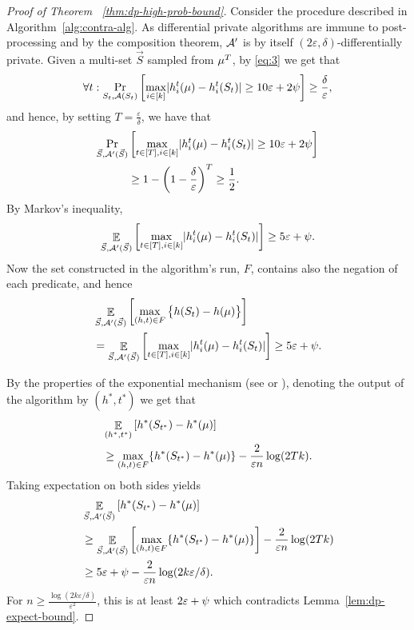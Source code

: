 \documentclass[12pt,a4paper,oneside,onecolumn]{book}
\begin{document}
\begin{proof}[Proof of Theorem ~\ref{thm:dp-high-prob-bound}]
  Consider the procedure
  described in Algorithm~\ref{alg:contra-alg}. As differential private algorithms are immune to post-processing
  and by the composition theorem,
  $\mathcal{A}'$ is by itself $(2\varepsilon, \delta)$-differentially private. 
  Given a multi-set $\vec{S}$ sampled from $\mu^T$,
  by \eqref{eq:3} we get that 
  \[\forall t: \Pr_{S_t,\mathcal{A}(S_t)}\left[
      \max_{i\in [k]}\lvert h^t_i(\mu)-h^t_i(S_t)\rvert\geq 10\varepsilon + 2\psi
    \right] \geq \frac{\delta}{\varepsilon},\]
  and hence, by setting $T=\frac{\varepsilon}{\delta}$, we have that 
  \begin{align*}
    \Pr_{\vec{S},\mathcal{A}'(\vec{S})} & 
    \left[
      \max_{t\in [T],i\in [k]}\lvert h^t_i(\mu)-h^t_i(S_t)\rvert 
      \geq 10\varepsilon + 2\psi
    \right] \\
    &\geq 
    1 - \left(1-\frac{\delta}{\varepsilon}\right)^T\geq \frac{1}{2}.
  \end{align*}
  By Markov's inequality,
  \[\mathop{\mathbb{E}}_{\vec{S},\mathcal{A}'(\vec{S})}\left[
      \max_{t\in [T],i\in [k]}\lvert h^t_i(\mu)-h^t_i(S_t)\rvert
    \right]
    \geq 5\varepsilon + \psi.\]
    Now
  the set constructed in the algorithm's run, $F$,  contains also the negation of each predicate,
  and hence
  \begin{align*}
    &\mathop{\mathbb{E}}_{\vec{S},\mathcal{A}'(\vec{S})}
    \left[
      \max_{(h,t)\in F}\big\{h(S_t) - h(\mu)\big\}
    \right] \\
    &=\mathop{\mathbb{E}}_{\vec{S},\mathcal{A}'(\vec{S})}\left[
      \max_{t\in [T],i\in [k]}\lvert h^t_i(\mu)-h^t_i(S_t)\rvert
    \right] 
    \geq 5\varepsilon + \psi      .
  \end{align*}

By the properties of the exponential mechanism
  (see \citet{mcsherry2007mechanism} or \citet{bassily2016algorithmic}), denoting the output of the algorithm by $(h^*,t^*)$ we get that
  \begin{align*}
    &\mathop{\mathbb{E}}_{(h^*,t^*)}
    \left[
    h^*(S_{t^*}) - h^*(\mu)
    \right] \\
    &\geq
    \max_{(h,t)\in F} \{ h^*(S_{t^*}) - h^*(\mu) \}
    - \frac{2}{\varepsilon n}\log(2Tk).
  \end{align*}
  Taking expectation on both sides yields
  \begin{align*}
    &\mathop{\mathbb{E}}_{\vec{S},\mathcal{A}'(\vec{S})} 
    \left[
    h^*(S_{t^*}) - h^*(\mu)
    \right] \\
    &\geq
    \mathop{\mathbb{E}}_{\vec{S},\mathcal{A}'(\vec{S})}\left[
    \max_{(h,t)\in F} \{ h^*(S_{t^*}) - h^*(\mu) \}
    \right]
    - \frac{2}{\varepsilon n}\log(2Tk) \\
    &\geq
    5\varepsilon + \psi - \frac{2}{\varepsilon n}\log(2k\varepsilon/\delta).
  \end{align*}
For $n \geq \frac{\log(2k\varepsilon/\delta)}{\varepsilon^2}$,
  this is at least $2\varepsilon + \psi$ which contradicts Lemma~\ref{lem:dp-expect-bound}.
\end{proof}

\cleardoublepage








\end{document}
